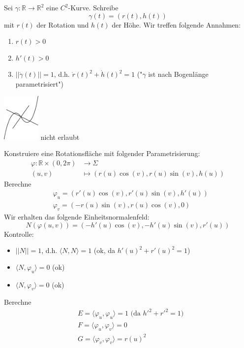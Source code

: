 \documentclass[../main.tex]{subfiles}
\begin{document}
\begin{minipage}{0.9\columnwidth}
    Sei $\gamma:\mathbb{R}\to\mathbb{R}^{2}$ eine $C^{2}$-Kurve. Schreibe $$\gamma(t) = (r(t),h(t))$$ mit $r(t)$ der Rotation und $h(t)$ der Höhe. Wir treffen folgende Annahmen:
    \begin{enumerate}
        \item $r(t)>0$
        \item $h'(t)>0$
        \item $||\dot{\gamma}(t)|| = 1$, d.h. $\dot{r}(t)^{2}+\dot{h}(t)^{2} = 1$ ("$\gamma$ ist nach Bogenlänge parametrisiert")
    \end{enumerate}
\end{minipage}
\vspace{0.05\linewidth}
\begin{minipage}{0.15\columnwidth}
    \includegraphics[width=5em]{figures/rotationsflaeche.pdf}
    \linebreak nicht erlaubt
\end{minipage}
\noindent
Konstruiere eine Rotationsfläche mit folgender Parametrisierung:\begin{align*}
    \varphi:\mathbb{R}\times(0,2\pi) &\to \Sigma\\
    (u,v) &\mapsto (r(u)\cos(v), r(u)\sin(v),h(u))
\end{align*}
Berechne \begin{align*}
    &\varphi_{u} = (r'(u)\cos(v), r'(u)\sin(v),h'(u))\\
    &\varphi_{v} = (-r(u)\sin(v), r(u)\cos(v), 0)
\end{align*}
Wir erhalten das folgende Einheitsnormalenfeld:
$$ N(\varphi(u,v)) = (-h'(u)\cos(v), -h'(u)\sin(v), r'(u))$$
Kontrolle:
\begin{itemize}
    \item $|| N || = 1$, d.h. $\langle N,N\rangle = 1$ (ok, da $h'(u)^{2}+r'(u)^{2}=1$)
    \item $\langle N,\varphi_{u}\rangle = 0$ (ok)
    \item $\langle N,\varphi_{v}\rangle = 0$ (ok)
\end{itemize}
Berechne \begin{align*}
    &E = \langle\varphi_{u},\varphi_{u}\rangle = 1 \text{ (da } h'^{2}+r'^{2}=1)\\
    &F = \langle\varphi_{u},\varphi_{v}\rangle = 0\\
    &G = \langle\varphi_{v},\varphi_{v}\rangle = r(u)^{2}
\end{align*}
\end{document}
